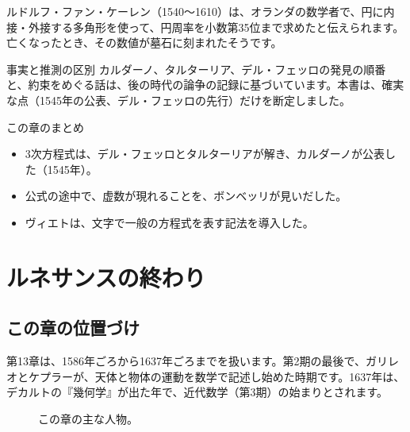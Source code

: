 \documentclass[a4paper,11pt,openany]{ltjsbook}
\begin{document}
ルドルフ・ファン・ケーレン（1540〜1610）は、オランダの数学者で、円に内接・外接する多角形を使って、円周率を小数第35位まで求めたと伝えられます。亡くなったとき、その数値が墓石に刻まれたそうです。

\begin{notebox}{事実と推測の区別}
カルダーノ、タルターリア、デル・フェッロの発見の順番と、約束をめぐる話は、後の時代の論争の記録に基づいています。本書は、確実な点（1545年の公表、デル・フェッロの先行）だけを断定しました。
\end{notebox}

\begin{pointbox}{この章のまとめ}
\begin{itemize}[leftmargin=*]
\item 3次方程式は、デル・フェッロとタルターリアが解き、カルダーノが公表した（1545年）。
\item 公式の途中で、虚数が現れることを、ボンベッリが見いだした。
\item ヴィエトは、文字で一般の方程式を表す記法を導入した。
\end{itemize}
\end{pointbox}

\chapter{ルネサンスの終わり}

\section{この章の位置づけ}

第13章は、1586年ごろから1637年ごろまでを扱います。第2期の最後で、ガリレオとケプラーが、天体と物体の運動を数学で記述し始めた時期です。1637年は、デカルトの『幾何学』が出た年で、近代数学（第3期）の始まりとされます。

\begin{figure}[htbp]
\centering
{}
\caption{この章の主な人物。}
\end{figure}
\end{document}
